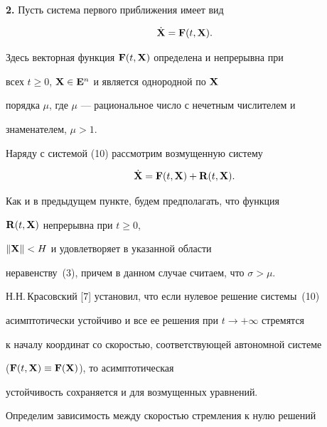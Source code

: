 \medskip





{\bf 2.} Пусть система первого приближения имеет вид


\begin{equation}


\Dot {\bold X}=\bold F(t, \bold X).


\end{equation}


Здесь векторная функция $\bold F(t, \bold X)$ определена и непрерывна при 


всех $t\geq 0$, $\bold X\in \bold E^n$ и является однородной по $\bold X$


порядка $\mu$, где $\mu$ --- рациональное число с нечетным числителем и 


знаменателем, $\mu>1$.





Наряду с системой (10) рассмотрим возмущенную систему


\begin{equation}


\Dot {\bold X}=\bold F(t, \bold X)+\bold R(t, \bold X).


\end{equation}


Как и в предыдущем пункте, будем предполагать, что функция


$\bold R(t,\bold X)$ непрерывна при \linebreak $t\geq 0$,


$\|\bold X\|<H$ и удовлетворяет в указанной области


неравенству~(3), причем в данном случае считаем, что $\sigma>\mu$.





Н.Н.\,Красовский [7] установил, что если нулевое решение системы~(10)


асимптотически устойчиво и все ее решения при $t\to +\infty$ стремятся


к началу координат со скоростью, соответствующей автономной системе


($\bold F(t, \bold X)\equiv \bold F(\bold X)$), то асимптотическая


устойчивость сохраняется и для возмущенных уравнений.





Определим зависимость между скоростью стремления к нулю решений


